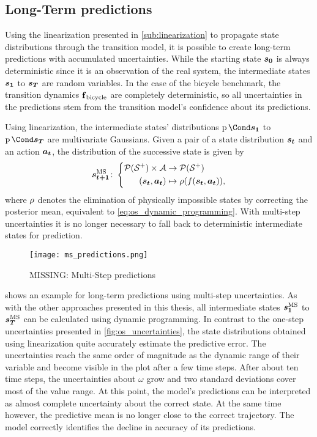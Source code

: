 \subsection{Long-Term predictions}
Using the linearization presented in \cref{sub:linearization} to propagate state distributions through the transition model, it is possible to create long-term predictions with accumulated uncertainties.
While the starting state $\bm{s_0}$ is always deterministic since it is an observation of the real system, the intermediate states $\bm{s_1}$ to $\bm{s_T}$ are random variables.
In the case of the bicycle benchmark, the transition dynamics $\operatorname{\operatorname{\mathbf{f}}_{\text{bicycle}}}$ are completely deterministic, so all uncertainties in the predictions stem from the transition model's confidence about its predictions.

Using linearization, the intermediate states' distributions $\Prob{\rv{s_1}}$ to $\Prob{\rv{s_T}}$ are multivariate Gaussians.
Given a pair of a state distribution $\bm{s_t}$ and an action $\bm{a_t}$, the distribution of the successive state is given by
\begin{align}
    \ms{\mat{s_{t+1}}} \colon \left\{
        \begin{aligned}
            \Dists(\Es^+) \times \Ah &\to \Dists(\Es^+) \\
            (\rv{s_t}, \mat{a_t}) &\mapsto \squeeze(f(\rv{s_t}, \mat{a_t})),
    \end{aligned}
    \right.
\end{align}
where $\squeeze$ denotes the elimination of physically impossible states by correcting the posterior mean, equivalent to \cref{eq:os_dynamic_programming}.
With multi-step uncertainties it is no longer necessary to fall back to deterministic intermediate states for prediction.

\begin{figure}[t]
    \centering
    \texttt{[image: ms\_predictions.png]}
    \caption{MISSING: Multi-Step predictions}
    \label{fig:ms_predictions}
\end{figure}
 shows an example for long-term predictions using multi-step uncertainties.
As with the other approaches presented in this thesis, all intermediate states $\bm{s_1}^{\text{MS}}$ to $\bm{s_T}^{\text{MS}}$ can be calculated using dynamic programming.
In contrast to the one-step uncertainties presented in \cref{fig:os_uncertainties}, the state distributions obtained using linearization quite accurately estimate the predictive error.
The uncertainties reach the same order of magnitude as the dynamic range of their variable and become visible in the plot after a few time steps.
After about  ten time steps, the uncertainties about $\omega$ grow and two standard deviations cover most of the value range.
At this point, the model's predictions can be interpreted as almost complete uncertainty about the correct state.
At the same time however, the predictive mean is no longer close to the correct trajectory.
The model correctly identifies the decline in accuracy of its predictions.

